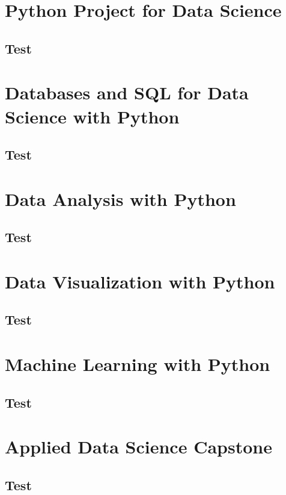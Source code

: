 \documentclass[12pt]{report} %
\begin{document}
	\chapter{Python Project for Data Science}
	\section{Test}
	
	\chapter{Databases and SQL for Data Science with Python}
	\section{Test}
	
	\chapter{Data Analysis with Python}
	\section{Test}
	
	\chapter{Data Visualization with Python}
	\section{Test}
	
	\chapter{Machine Learning with Python}
	\section{Test}
	
	\chapter{Applied Data Science Capstone}
	\section{Test}
	
\end{document}
